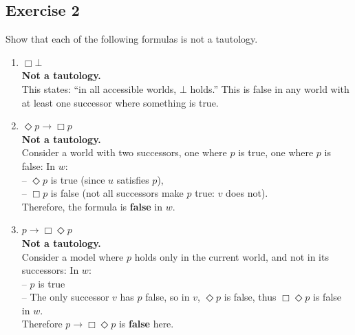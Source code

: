 \documentclass[11pt]{article}
\begin{document}

    \subsection{Exercise 2}

    Show that each of the following formulas is not a tautology.

    \begin{enumerate}
        \item[(a)] $\Box\bot$ \\[1ex]
        \textbf{Not a tautology.} \\
        This states: ``in all accessible worlds, $\bot$ holds.'' This is false in any world with at least one successor where something is true.

        \item[(b)] $\Diamond p \rightarrow \Box p$ \\[1ex]
        \textbf{Not a tautology.} \\
        Consider a world with two successors, one where $p$ is true, one where $p$ is false:
        In $w$: \\
        -- $\Diamond p$ is true (since $u$ satisfies $p$), \\
        -- $\Box p$ is false (not all successors make $p$ true: $v$ does not). \\
        Therefore, the formula is \textbf{false} in $w$.

        \item[(c)] $p \rightarrow \Box\Diamond p$ \\[1ex]
        \textbf{Not a tautology.} \\
        Consider a model where $p$ holds only in the current world, and not in its successors:
        In $w$: \\
        -- $p$ is true \\
        -- The only successor $v$ has $p$ false, so in $v$, $\Diamond p$ is false, thus $\Box\Diamond p$ is false in $w$.\\
        Therefore $p \rightarrow \Box\Diamond p$ is \textbf{false} here.


\end{enumerate}
\end{document}
